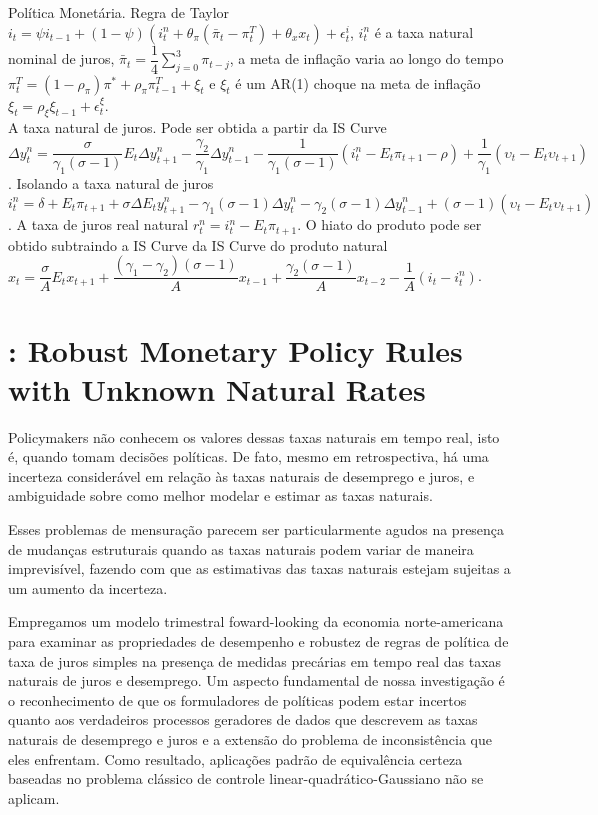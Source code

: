 \documentclass[11pt,oneside,a4paper]{article}
\begin{document}
Política Monetária. Regra de Taylor $i_t = \psi i_{t-1} + (1 - \psi)(i_t^{n} + \theta_{\pi}(\bar{\pi}_t - \pi_t^{T}) + \theta_x x_t ) + \epsilon_t^{i} $, $i_t^{n}$ é a taxa natural nominal de juros, $\bar{\pi}_t = \dfrac{1}{4} \sum_{j=0}^{3} \pi_{t-j}$, a meta de inflação varia ao longo do tempo $\pi_t^{T} = (1 - \rho_{\pi}) \pi^{*} + \rho_{\pi}\pi_{t-1}^{T} + \xi_t$ e $\xi_t $ é um AR(1) choque na meta de inflação $\xi_t = \rho_{\xi}\xi_{t-1} + \epsilon_t^{\xi}$.\\

A taxa natural de juros. Pode ser obtida a partir da IS Curve $\Delta y_t^{n} = \dfrac{\sigma}{\gamma_1(\sigma -1 )}E_t \Delta y_{t+1}^{n} - \dfrac{\gamma_2}{\gamma_1}\Delta y_{t-1}^{n} - \dfrac{1}{\gamma_1 (\sigma -1)}(i_t^{n} - E_t \pi_{t+1} - \rho) + \dfrac{1}{\gamma_1}(\upsilon_t - E_t \upsilon_{t+1}) $. Isolando a taxa natural de juros $i_t^{n} = \delta + E_t \pi_{t+1} + \sigma \Delta E_t y_{t+1}^{n} - \gamma_1 (\sigma -1) \Delta y_t^{n} - \gamma_2(\sigma -1) \Delta y_{t-1}^{n} + (\sigma -1)(\upsilon_t - E_t \upsilon_{t+1}) $. A taxa de juros real natural $ r_t^{n} = i_t^{n} - E_t \pi_{t+1}$. O hiato do produto pode ser obtido subtraindo a IS Curve da IS Curve do produto natural $ x_t = \dfrac{\sigma}{A}E_t x_{t+1} + \dfrac{(\gamma_1 - \gamma_2)(\sigma -1 )}{A}x_{t-1} + \dfrac{\gamma_2(\sigma -1)}{A}x_{t-2} - \dfrac{1}{A}(i_t - i_t^{n}) $.
%
%
\section{\citet{Orphanides:2002}: Robust Monetary Policy Rules with Unknown Natural Rates }
Policymakers não conhecem os valores dessas taxas naturais em tempo real, isto é, quando tomam decisões políticas. De fato, mesmo em retrospectiva, há uma incerteza considerável em relação às taxas naturais de desemprego e juros, e ambiguidade sobre como melhor modelar e estimar as taxas naturais.

Esses problemas de mensuração parecem ser particularmente agudos na presença de mudanças estruturais quando as taxas naturais podem variar de maneira imprevisível, fazendo com que as estimativas das taxas naturais estejam sujeitas a um aumento da incerteza.

Empregamos um modelo trimestral foward-looking da economia norte-americana para examinar as propriedades de desempenho e robustez de regras de política de taxa de juros simples na presença de medidas precárias em tempo real das taxas naturais de juros e desemprego. Um aspecto fundamental de nossa investigação é o reconhecimento de que os formuladores de políticas podem estar incertos quanto aos verdadeiros processos geradores de dados que descrevem as taxas naturais de desemprego e juros e a extensão do problema de inconsistência que eles enfrentam. Como resultado, aplicações padrão de equivalência certeza baseadas no problema clássico de controle linear-quadrático-Gaussiano não se aplicam.
\end{document}

